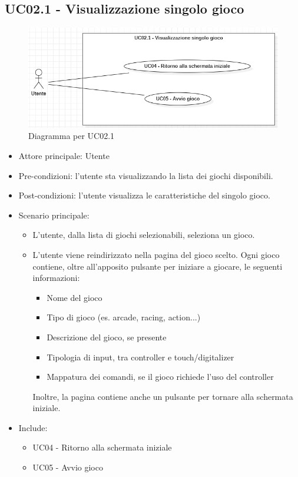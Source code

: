 \subsection{UC02.1 - Visualizzazione singolo gioco}
\begin{figure}[h]
    \centering
    \includegraphics[width=400pt]{images/usecase/UC02_1.png}
    \caption{Diagramma per UC02.1}
    \label{fig:attore}
\end{figure}
\begin{itemize}
    \item Attore principale: Utente
    \item Pre-condizioni: l'utente sta visualizzando la lista dei giochi disponibili.
    \item Post-condizioni: l'utente visualizza le caratteristiche del singolo gioco.
    \item Scenario principale: \begin{itemize}
        \item L'utente, dalla lista di giochi selezionabili, seleziona un gioco.
        \item L'utente viene reindirizzato nella pagina del gioco scelto. Ogni gioco contiene, oltre all'apposito pulsante per iniziare a giocare, le seguenti informazioni: \begin{itemize}
            \item Nome del gioco
            \item Tipo di gioco (es. arcade, racing, action...)
            \item Descrizione del gioco, se presente
            \item Tipologia di input, tra controller e touch/digitalizer
            \item Mappatura dei comandi, se il gioco richiede l'uso del controller
        \end{itemize} Inoltre, la pagina contiene anche un pulsante per tornare alla schermata iniziale.
    \end{itemize}
    \item Include: \begin{itemize}
        \item UC04 - Ritorno alla schermata iniziale
        \item UC05 - Avvio gioco
    \end{itemize}
\end{itemize}
\newpage
